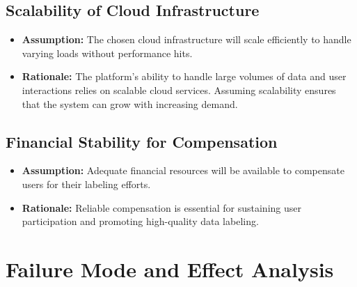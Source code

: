 \documentclass{article}
\begin{document}
\subsection*{Scalability of Cloud Infrastructure}
\begin{itemize}
  \item \textbf{Assumption:} The chosen cloud infrastructure will scale efficiently to handle varying loads without performance hits.
  \item \textbf{Rationale:} The platform's ability to handle large volumes of data and user interactions relies on scalable cloud services. Assuming scalability ensures that the system can grow with increasing demand.
\end{itemize}

\subsection*{Financial Stability for Compensation}
\begin{itemize}
  \item \textbf{Assumption:} Adequate financial resources will be available to compensate users for their labeling efforts.
  \item \textbf{Rationale:} Reliable compensation is essential for sustaining user participation and promoting high-quality data labeling.
\end{itemize}


\section{Failure Mode and Effect Analysis}
\end{document}
